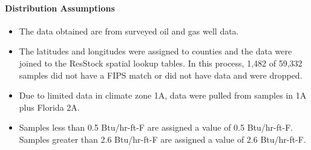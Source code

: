 \paragraph{Distribution Assumptions}
% 
\begin{itemize}
\item
  The data obtained are from surveyed oil and gas well data.
\item
  The latitudes and longitudes were assigned to counties and the data were
  joined to the ResStock spatial lookup tables. In this process, 1,482 of
  59,332 samples did not have a FIPS match or did not have data and were
  dropped.
\item
  Due to limited data in climate zone 1A, data were pulled from samples
  in 1A plus Florida 2A.
\item
  Samples less than 0.5 Btu/hr-ft-F are assigned a value of 0.5
  Btu/hr-ft-F. Samples greater than 2.6 Btu/hr-ft-F are assigned a value
  of 2.6 Btu/hr-ft-F.
\end{itemize}

